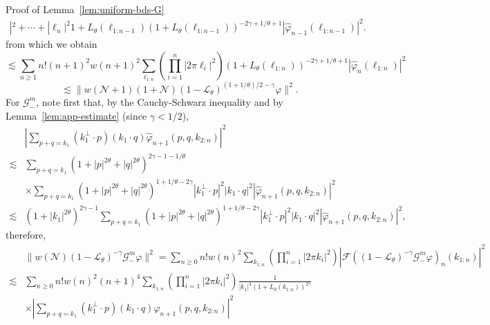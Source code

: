 \documentclass[10pt]{article}
\newenvironment{proof*}[1]{\noindent\textbf{#1\ }}{\hspace*{\fill}$\Box$\medskip}
\begin{document}
\begin{proof*}{Proof of Lemma~\ref{lem:uniform-bds-G}}
\[\begin{array}{ll}
{       |^2 + \cdots + | \ell_n |^2}{1 + L_{\theta} (\ell_{1 : n - 1})} (1 +
       L_{\theta} (\ell_{1 : n - 1}))^{- 2 \gamma + 1 / \theta + 1} |
       \hat{\varphi}_{n - 1} (\ell_{1 : n - 1}) |^2 .
     \end{array} \]
  from which we obtain
  \[ \lesssim \sum_{n \geqslant 1} n! (n + 1)^2 w (n + 1)^2 \sum_{\ell_{1 :
     n}} \left( \prod_{i = 1}^n | 2 \pi \ell_i |^2 \right) (1 + L_{\theta}
     (\ell_{1 : n}))^{- 2 \gamma + 1 / \theta + 1} | \hat{\varphi}_n (\ell_{1
     : n}) |^2 \]
  \[ \lesssim \| w (\mathcal{N}+ 1) (1 +\mathcal{N}) (1
     -\mathcal{L}_{\theta})^{(1 + 1 / \theta) / 2 - \gamma} \varphi \|^2 . \]
  For $\mathcal{G}_-^m$, note first that, by the Cauchy-Schwarz inequality and
  by Lemma~\ref{lem:app-estimate} (since $\gamma < 1 / 2$),
  \[ \begin{array}{ll}
       & \left| \sum_{p + q = k_1} (k_1^{\perp} \cdot p)  (k_1 \cdot q)
       \hat{\varphi}_{n + 1} (p, q, k_{2 : n}) \right|^2\\
       \lesssim & \sum_{p + q = k_1} (1 + | p |^{2 \theta} + | q |^{2
       \theta})^{2 \gamma - 1 - 1 / \theta}\\
       & \times \sum_{p + q = k_1} (1 + | p |^{2 \theta} + | q |^{2
       \theta})^{1 + 1 / \theta - 2 \gamma} | k_1^{\perp} \cdot p |^2  | k_1
       \cdot q |^2 | \hat{\varphi}_{n + 1} (p, q, k_{2 : n}) |^2\\
       \lesssim & (1 + | k_1 |^{2 \theta})^{2 \gamma - 1} \sum_{p + q = k_1}
       (1 + | p |^{2 \theta} + | q |^{2 \theta})^{1 + 1 / \theta - 2 \gamma} |
       k_1^{\perp} \cdot p |^2  | k_1 \cdot q |^2 | \hat{\varphi}_{n + 1} (p,
       q, k_{2 : n}) |^2,
     \end{array} \]
  therefore,
  \[ \begin{array}{ll}
       & \| w (\mathcal{N}) (1 -\mathcal{L}_{\theta})^{- \gamma}
       \mathcal{G}_-^m \varphi \|^2 = \sum_{n \geqslant 0} n! w (n)^2
       \sum_{k_{1 : n}} \left( \prod_{i = 1}^n | 2 \pi k_i |^2 \right) |
       \mathcal{F} ((1 -\mathcal{L}_{\theta})^{- \gamma} \mathcal{G}_-^m
       \varphi)_n (k_{1 : n}) |^2\\
       \lesssim & \sum_{n \geqslant 0} n! w (n)^2 (n + 1)^4 \sum_{k_{1 : n}}
       \left( \prod_{i = 1}^n | 2 \pi k_i |^2 \right) \frac{1}{| k_1 |^4 (1 +
       L_{\theta} (k_{1 : n}))^{2 \gamma}}\\
       & \times \left| \sum_{p + q = k_1} (k_1^{\perp} \cdot p)  (k_1 \cdot
       q) \hat{\varphi}_{n + 1} (p, q, k_{2 : n}) \right|^2\\

\end{array}\]
\end{proof*}
\end{document}
